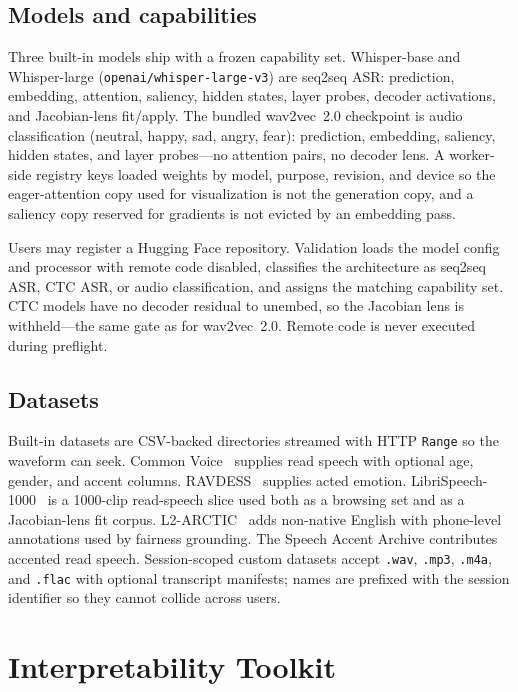\documentclass[conference]{IEEEtran}
\begin{document}
\subsection{Models and capabilities}

Three built-in models ship with a frozen capability set. Whisper-base and Whisper-large (\texttt{openai/whisper-large-v3}) are seq2seq ASR: prediction, embedding, attention, saliency, hidden states, layer probes, decoder activations, and Jacobian-lens fit/apply. The bundled wav2vec~2.0 checkpoint is audio classification (neutral, happy, sad, angry, fear): prediction, embedding, saliency, hidden states, and layer probes---no attention pairs, no decoder lens. A worker-side registry keys loaded weights by model, purpose, revision, and device so the eager-attention copy used for visualization is not the generation copy, and a saliency copy reserved for gradients is not evicted by an embedding pass.

Users may register a Hugging Face repository. Validation loads the model config and processor with remote code disabled, classifies the architecture as seq2seq ASR, CTC ASR, or audio classification, and assigns the matching capability set. CTC models have no decoder residual to unembed, so the Jacobian lens is withheld---the same gate as for wav2vec~2.0. Remote code is never executed during preflight.

\subsection{Datasets}

Built-in datasets are CSV-backed directories streamed with HTTP \texttt{Range} so the waveform can seek. Common Voice~\cite{ardila2020commonvoice} supplies read speech with optional age, gender, and accent columns. RAVDESS~\cite{livingstone2018ravdess} supplies acted emotion. LibriSpeech-1000~\cite{panayotov2015librispeech} is a 1000-clip read-speech slice used both as a browsing set and as a Jacobian-lens fit corpus. L2-ARCTIC~\cite{zhao2018l2arctic} adds non-native English with phone-level annotations used by fairness grounding. The Speech Accent Archive contributes accented read speech. Session-scoped custom datasets accept \texttt{.wav}, \texttt{.mp3}, \texttt{.m4a}, and \texttt{.flac} with optional transcript manifests; names are prefixed with the session identifier so they cannot collide across users.

\section{Interpretability Toolkit}
\end{document}
